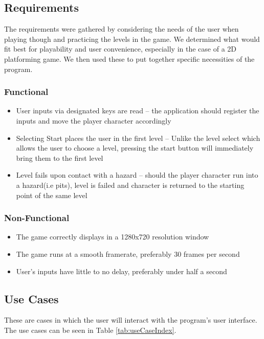 \documentclass[10pt,conference,onecolumn,compsoc]{IEEEtran}
\begin{document}
\subsection{Requirements}
The requirements were gathered by considering the needs of the user when playing though and practicing the levels in the game. We determined what would fit best for playability and user convenience, especially in the case of a 2D platforming game. We then used these to put together specific necessities of the program.

\subsubsection{Functional}
\begin{itemize}
\item User inputs via designated keys are read – the application should register the inputs and move the player character accordingly
\item Selecting Start places the user in the first level – Unlike the level select which allows the user to choose a level, pressing the start button will immediately bring them to the first level
\item Level fails upon contact with a hazard – should the player character run into a hazard(i.e pits), level is failed and character is returned to the starting point of the same level
\end{itemize}

\subsubsection{Non-Functional}
\begin{itemize}
\item The game correctly displays in a 1280x720 resolution window
\item The game runs at a smooth framerate, preferably 30 frames per second
\item User's inputs have little to no delay, preferably under half a second
\end{itemize}

\subsection{Use Cases}
These are cases in which the user will interact with the program's user interface. The use cases can be seen in Table \ref{tab:useCaseIndex}.
\end{document}
